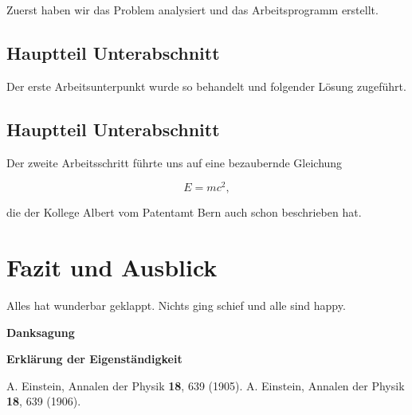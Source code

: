 \documentclass[a4paper,12pt]{article}
\begin{document}
Zuerst haben wir das Problem analysiert und das Arbeitsprogramm erstellt.

\subsection{Hauptteil Unterabschnitt}\label{sec2.1}

Der erste Arbeitsunterpunkt wurde so behandelt und folgender L\"osung zugef\"uhrt.

\subsection{Hauptteil Unterabschnitt}\label{sec2.2}

Der zweite Arbeitsschritt f\"uhrte uns auf eine bezaubernde Gleichung

\begin{equation}
	E = mc^2 ,
\end{equation}

die der Kollege Albert vom Patentamt Bern  \cite{Alb05} auch schon beschrieben hat.


\section{Fazit und Ausblick}\label{sec3}

Alles hat wunderbar geklappt. Nichts ging schief und alle sind happy.


\bigskip


{\large\bf Danksagung}

\bigskip


{\large\bf Erkl\"arung der Eigenst\"andigkeit}

\bigskip


\begin{thebibliography}{99}
	\itemsep-2pt \small\frenchspacing
	A. Einstein, Annalen der Physik {\bf 18}, 639 (1905).
	\newline
	A. Einstein, Annalen der Physik {\bf 18}, 639 (1906).
\end{thebibliography}
\end{document}
